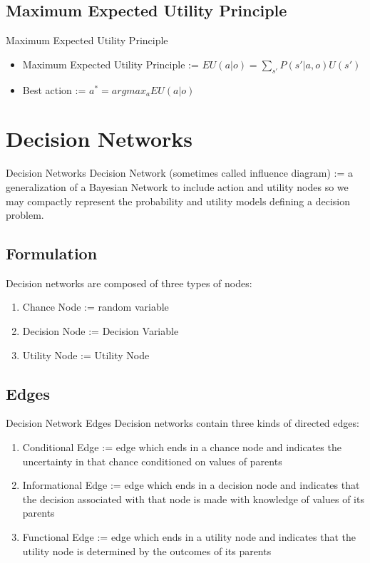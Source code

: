 \documentclass{beamer}
\begin{document}
\subsection{Maximum Expected Utility Principle}
\begin{frame}{Maximum Expected Utility Principle}
\begin{itemize}
    \item Maximum Expected Utility Principle := $EU(a|o) = \sum_{s'}P(s'|a,o)U(s')$
    \item Best action := $a^* = argmax_{a}EU(a|o)$
\end{itemize} 
\end{frame}

\section{Decision Networks}
\begin{frame}{Decision Networks}
Decision Network (sometimes called influence diagram) := a generalization of a Bayesian Network to include action and utility nodes so we may compactly represent the probability and utility models defining a decision problem. 

\subsection{Formulation}
Decision networks are composed of three types of nodes:
\begin{enumerate}[i]
    \item Chance Node := random variable
    \item Decision Node := Decision Variable
    \item Utility Node := Utility Node
\end{enumerate}
\end{frame}

\subsection{Edges}
\begin{frame}{Decision Network Edges}
Decision networks contain three kinds of directed edges:
\begin{enumerate}[i]
    \item Conditional Edge := edge which ends in a chance node and indicates the uncertainty in that chance conditioned on values of parents
    \item Informational Edge := edge which ends in a decision node and indicates that the decision associated with that node is made with knowledge of values of its parents 
    \item Functional Edge := edge which ends in a utility node and indicates that the utility node is determined by the outcomes of its parents
\end{enumerate}
\end{frame}
\end{document}
